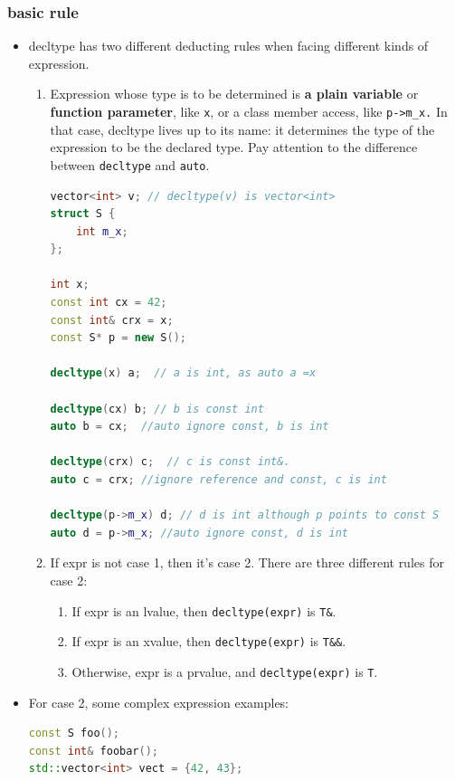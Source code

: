 \documentclass[a4paper,11pt,twoside]{book}
\begin{document}
\subsubsection{basic rule}
\begin{itemize}
	\item decltype has two different deducting rules when facing different kinds of expression.
	
	\begin{enumerate}
		\item Expression whose type is to be determined is \textbf{a plain variable} or \textbf{function parameter}, like \texttt{x}, or a class member access, like \texttt{p->m\_x.} In that case, decltype lives up to its name: it determines the type of the expression to be the declared type.  Pay attention to the difference between \texttt{decltype} and \texttt{auto}.
\begin{lstlisting}[frame=single, language=c++]
vector<int> v; // decltype(v) is vector<int>
struct S {
	int m_x;
};

int x;
const int cx = 42;
const int& crx = x;
const S* p = new S();

decltype(x) a;  // a is int, as auto a =x

decltype(cx) b; // b is const int
auto b = cx;  //auto ignore const, b is int

decltype(crx) c;  // c is const int&.
auto c = crx; //ignore reference and const, c is int

decltype(p->m_x) d; // d is int although p points to const S
auto d = p->m_x; //auto ignore const, d is int
\end{lstlisting}
		
		\item If expr is not case 1, then it's case 2. There are three different rules for case 2:
		\begin{enumerate}
			\item If expr is an lvalue, then \texttt{decltype(expr)} is \texttt{T\&}. 
			\item If expr is an xvalue, then \texttt{decltype(expr)} is \texttt{T\&\&}. 
			\item Otherwise, expr is a prvalue, and \texttt{decltype(expr)} is \texttt{T}.
		\end{enumerate}
	\end{enumerate}


\item For case 2, some complex expression examples:
\begin{lstlisting}[frame=single, language=c++]
const S foo();
const int& foobar();
std::vector<int> vect = {42, 43};


\end{lstlisting}
\end{itemize}
\end{document}
